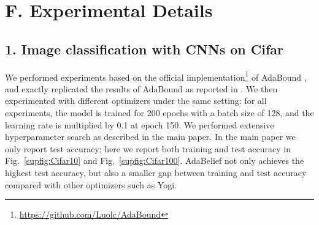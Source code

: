 \documentclass{article}
\begin{document}
\FloatBarrier
\newpage
\section*{F. Experimental Details}
\subsection*{1. Image classification with CNNs on Cifar}
We performed experiments based on the official implementation\footnote{\url{https://github.com/Luolc/AdaBound}} of AdaBound \cite{luo2019adaptive}, and exactly replicated the results of AdaBound as reported in \cite{luo2019adaptive}. We then experimented with different optimizers under the same setting: for all experiments, the model is trained for 200 epochs with a batch size of 128, and the learning rate is multiplied by 0.1 at epoch 150. We performed extensive hyperparameter search as described in the main paper. In the main paper we only report test accuracy; here we report both training and test accuracy in Fig.~\ref{supfig:Cifar10} and Fig.~\ref{supfig:Cifar100}. AdaBelief not only achieves the highest test accuracy, but also a smaller gap between training and test accuracy compared with other optimizers such as Yogi.
\end{document}
